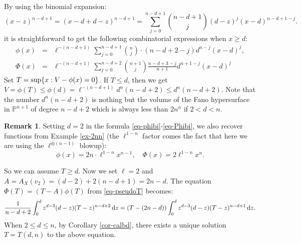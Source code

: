 \documentclass[12pt]{amsart}
\theoremstyle{definition}
\newtheorem{rmk}[thm]{Remark}
\def\sup{{\rm sup}}
\def\dif{{\rm d}}
\newcommand{\IP}{{\mathbb P}}
\begin{document}
By using the binomial expansion:
\begin{equation*}
    (x-z)^{n-d+1}=(x-d+d-z)^{n-d+1}=\sum_{j=0}^{n-d+1}\binom{n-d+1}{j}(d-z)^j(x-d)^{n-d+1-j}. 
\end{equation*}
it is straightforward to get the following combinatorial expressions when $x\ge d$:
    \begin{eqnarray}
    \phi(x)%
    &=&\ell^{-(n-d+1)}\sum_{j=0}^{n-d+1}\binom{n}{j}\cdot (n-d+2-j) d^{n-j}(x-d)^j,\label{eq-phibi}\\
\Phi(x)%
&=& \ell^{-(n-d+1)}\sum_{j=0}^{n-d+2} \binom{n+1}{j}\frac{n-d+3-j}{n+1}d^{n+1-j}(x-d)^j\label{eq-Phibi}
\end{eqnarray}
    Set $T=\sup\{x: V-\phi(x)=0\}$. If $T\le d$, then we get $V=\phi(T)\le \phi(d)=\ell^{-(n-d+1)}d^{n}(n-d+2)\le d^n (n-d+2)$. Note that the number $d^n(n-d+2)$ is nothing but the volume of the Fano hypersurface in $\IP^{n+1}$ of degree $n-d+2$ which is always less than $2n^n$ if $2<d<n$. 

\begin{rmk}\label{rmk-2nn}
    Setting $d=2$ in the formula \eqref{eq-phibi}-\eqref{eq-Phibi}, we also recover functions from Example \ref{ex-2nn} (the $\ell^{1-n}$ factor comes the fact that here we are using the $\ell^{\oplus (n-1)}$ blowup): 
    \begin{equation*}
        \phi(x)=2n\cdot \ell^{1-n}x^{n-1}, \quad \Phi(x)= 2 \ell^{1-n}x^n.
    \end{equation*}
\end{rmk}

So we can assume $T\ge d$.
Now we set $\ell=2$ and $A=A_X(v_2)=(d-2)+2(n-d+1)=2n-d$. The equation $\Phi(T)=(T-A)\phi(T)$ from \eqref{eq-pseudoT} becomes:
\begin{equation}\label{eq-key}
    \frac{1}{n-d+2}\int_0^d z^{d-3}(d-z)(T-z)^{n-d+2}\, \dif z=
    (T-(2n-d))\int_0^d z^{d-3}(d-z)(T-z)^{n-d+1}\, \dif z.
\end{equation}
When $2\le d\le n$, by Corollary \ref{cor-calbd}, there exists a unique solution $T=T(d, n)$ to the above equation. 
\end{document}
